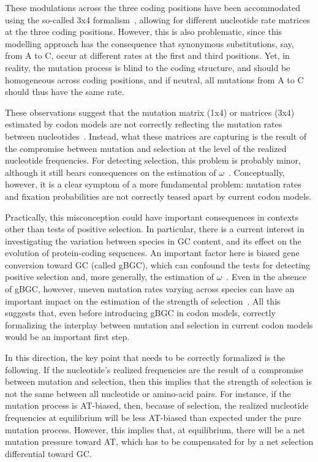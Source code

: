 \documentclass{article}
\begin{document}
These modulations across the three coding positions have been accommodated using the so-called 3x4 formalism~\citep{Goldman1994, Pond2005a}, allowing for different nucleotide rate matrices at the three coding positions.
However, this is also problematic, since this modelling approach has the consequence that {synonymous} {substitutions}, say, from A to C, occur at different rates at the first and third positions.
Yet, in reality, the mutation process is blind to the coding structure, and should be homogeneous across coding positions, and if {neutral}, all mutations from A to C should thus have the same rate.

These observations suggest that the mutation matrix (1x4) or matrices (3x4) estimated by codon models are not correctly reflecting the mutation rates between nucleotides~\citep{Rodrigue2008a, KosakovskyPond2010}.
Instead, what these matrices are capturing is the result of the compromise between mutation and selection at the level of the realized nucleotide frequencies.
For detecting selection, this problem is probably minor, although it still bears consequences on the estimation of $\omega$~\citep{Spielman2015}.
Conceptually, however, it is a clear symptom of a more fundamental problem: mutation rates and fixation probabilities are not correctly teased apart by current codon models.

Practically, this misconception could have important consequences in contexts other than tests of positive selection.
In particular, there is a current interest in investigating the variation between species in GC content, and its effect on the evolution of protein-coding sequences.
An important factor here is biased gene conversion toward GC (called {gBGC}), which can confound the tests for detecting positive selection and, more generally, the estimation of $\omega$~\citep{Galtier2009,Ratnakumar2010, Lartillot2013, Figuet2014, Bolivar2019}.
Even in the absence of {gBGC}, however, uneven mutation rates varying across species can have an important impact on the estimation of the strength of selection~\citep{Gueguen2018}.
All this suggests that, even before introducing {gBGC} in codon models, correctly formalizing the interplay between mutation and selection in current codon models would be an important first step.

In this direction, the key point that needs to be correctly formalized is the following.
If the nucleotide's realized frequencies are the result of a compromise between mutation and selection, then this implies that the strength of selection is not the same between all nucleotide or amino-acid pairs.
For instance, if the mutation process is AT-biased, then, because of selection, the realized nucleotide frequencies at equilibrium will be less AT-biased than expected under the pure mutation process.
However, this implies that, at equilibrium, there will be a net mutation pressure toward AT, which has to be compensated for by a net selection differential toward GC.
\end{document}
